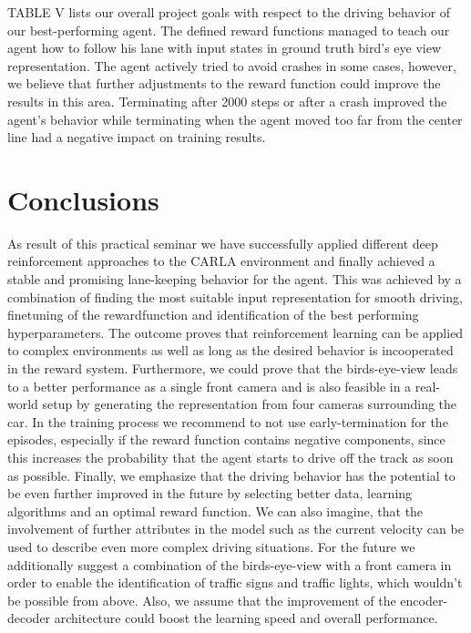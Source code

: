 \documentclass[letterpaper, 10 pt, conference]{ieeeconf}  %
\begin{document}
TABLE V lists our overall project goals with respect to the driving behavior of our best-performing agent. 
The defined reward functions managed to teach our agent how to follow his lane with input states in ground truth bird's eye view representation.
The agent actively tried to avoid crashes in some cases, however, we believe that further adjustments to the reward function could improve 
the results in this area. Terminating after 2000 steps or after a crash improved the agent's behavior while terminating when the agent moved too far
from the center line had a negative impact on training results. 


\section{Conclusions}
As result of this practical seminar we have successfully applied different deep reinforcement 
approaches to the CARLA environment and finally achieved a stable and promising lane-keeping behavior 
for the agent. This was achieved by a combination of finding the most suitable input representation for 
smooth driving, finetuning of the rewardfunction and identification of the best performing hyperparameters. 
The outcome proves that reinforcement learning can be applied to complex environments as well as long as the 
desired behavior is incooperated in the reward system. Furthermore, we could prove that the birds-eye-view leads 
to a better performance as a single front camera and is also feasible in a real-world setup by generating the 
representation from four cameras surrounding the car. In the training process we recommend to not use early-termination 
for the episodes, especially if the reward function contains negative components, since this increases the probability that 
the agent starts to drive off the track as soon as possible. Finally, we emphasize that the driving behavior has the potential 
to be even further improved in the future by selecting better data, learning algorithms and an optimal reward function. 
We can also imagine, that the involvement of further attributes in the model such as the current velocity can be used 
to describe even more complex driving situations.  \newline
For the future we additionally suggest a combination of the birds-eye-view with a front camera 
in order to enable the identification of traffic signs and traffic lights, which wouldn't be 
possible from above. Also, we assume that the improvement of the encoder-decoder 
architecture could boost the learning speed and overall performance.
\end{document}
